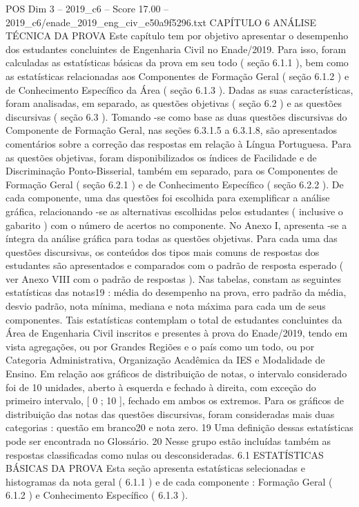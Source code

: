 \begin{textsample}{POS Dim 3 – 2019\_c6 – Score 17.00 – 2019\_c6/enade\_2019\_eng\_civ\_e50a9f5296.txt}  \label{ex:f3_pos_004}
CAPÍTULO 6 ANÁLISE TÉCNICA DA PROVA Este capítulo tem por objetivo apresentar o desempenho dos estudantes concluintes de Engenharia Civil no Enade/2019.
Para isso, foram calculadas as estatísticas básicas da prova em seu todo ( seção 6.1.1 ), bem como as estatísticas relacionadas aos Componentes de Formação Geral ( seção 6.1.2 ) e de Conhecimento Específico da Área ( seção 6.1.3 ).
Dadas as suas características, foram analisadas, em separado, as questões objetivas ( seção 6.2 ) e as questões discursivas ( seção 6.3 ).
Tomando -se como base as duas questões discursivas do Componente de Formação Geral, nas seções 6.3.1.5 a 6.3.1.8, são apresentados comentários sobre a correção das respostas em relação à Língua Portuguesa.
Para as questões objetivas, foram disponibilizados os índices de Facilidade e de Discriminação Ponto-Bisserial, também em separado, para os Componentes de Formação Geral ( seção 6.2.1 ) e de Conhecimento Específico ( seção 6.2.2 ).
De cada componente, uma das questões foi escolhida para exemplificar a análise gráfica, relacionando -se as alternativas escolhidas pelos estudantes ( inclusive o gabarito ) com o número de acertos no componente.
No Anexo I, apresenta -se a íntegra da análise gráfica para todas as questões objetivas.
Para cada uma das questões discursivas, os conteúdos dos tipos mais comuns de respostas dos estudantes são apresentados e comparados com o padrão de resposta esperado ( ver Anexo VIII com o padrão de respostas ).
Nas tabelas, constam as seguintes estatísticas das notas19 : média do desempenho na prova, erro padrão da média, desvio padrão, nota mínima, mediana e nota máxima para cada um de seus componentes.
Tais estatísticas contemplam o total de estudantes concluintes da Área de Engenharia Civil inscritos e presentes à prova do Enade/2019, tendo em vista agregações, ou por Grandes Regiões e o país como um todo, ou por Categoria Administrativa, Organização Acadêmica da IES e Modalidade de Ensino.
Em relação aos gráficos de distribuição de notas, o intervalo considerado foi de 10 unidades, aberto à esquerda e fechado à direita, com exceção do primeiro intervalo, [ 0 ; 10 ], fechado em ambos os extremos.
Para os gráficos de distribuição das notas das questões discursivas, foram consideradas mais duas categorias : questão em branco20 e nota zero. 19 Uma definição dessas estatísticas pode ser encontrada no Glossário. 20 Nesse grupo estão incluídas também as respostas classificadas como nulas ou desconsideradas. 6.1 ESTATÍSTICAS BÁSICAS DA PROVA Esta seção apresenta estatísticas selecionadas e histogramas da nota geral ( 6.1.1 ) e de cada componente : Formação Geral ( 6.1.2 ) e Conhecimento Específico ( 6.1.3 ).

\end{textsample}
